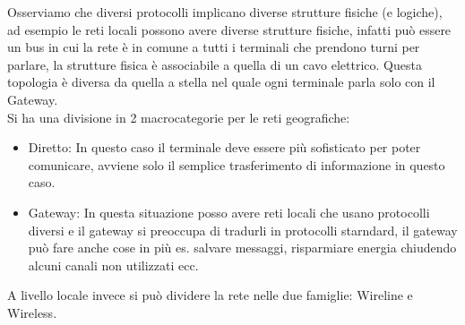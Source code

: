 \documentclass[11pt, twocolumn]{article}
\newenvironment{myitemize}
{ \begin{itemize}[topsep=0ex]
		\setlength{\itemsep}{0pt}
		\setlength{\parskip}{0pt}
		\setlength{\parsep}{0pt}     }
	{ \end{itemize}                  }
\begin{document}
Osserviamo che diversi protocolli implicano diverse strutture fisiche (e logiche), ad esempio le reti locali possono avere diverse strutture fisiche, infatti può essere un bus in cui la rete è in comune a tutti i terminali che prendono turni per parlare, la strutture fisica è associabile a quella di un cavo elettrico.
Questa topologia è diversa da quella a stella nel quale ogni terminale parla solo con il Gateway.\\
Si ha una divisione in 2 macrocategorie per le reti geografiche:
\begin{myitemize}
  \item Diretto: In questo caso il terminale deve essere più sofisticato per poter comunicare, avviene solo il semplice trasferimento di informazione in questo caso.
  \item Gateway: In questa situazione posso avere reti locali che usano protocolli diversi e il gateway si preoccupa di tradurli in protocolli starndard, il gateway può fare anche cose in più es. salvare messaggi, risparmiare energia chiudendo alcuni canali non utilizzati ecc. 
\end{myitemize}
A livello locale invece si può dividere la rete nelle due famiglie: Wireline e Wireless.
\end{document}
